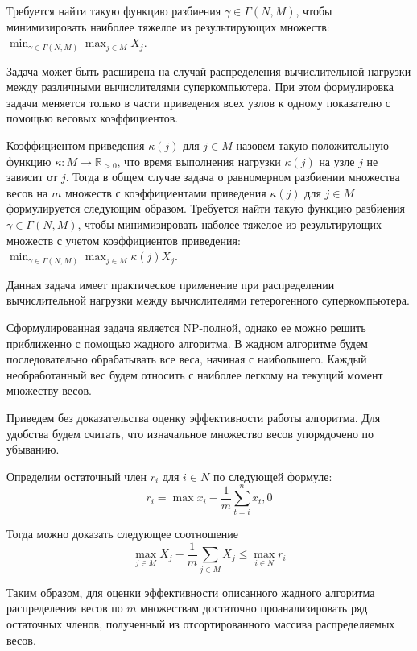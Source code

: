 Требуется найти такую функцию разбиения $\gamma \in \Gamma(N, M)$, чтобы минимизировать наиболее тяжелое из результирующих множеств: $\min_{\gamma \in \Gamma(N, M)}{\max_{j \in M}{X_j}}$.

Задача может быть расширена на случай распределения вычислительной нагрузки между различными вычислителями суперкомпьютера. При этом формулировка задачи меняется только в части приведения всех узлов к одному показателю с помощью весовых коэффициентов.

Коэффициентом приведения $\kappa(j)$ для $j \in M$ назовем такую положительную функцию $\kappa: M \rightarrow \mathbb{R}_{>0}$, что время выполнения нагрузки $\kappa(j)$ на узле $j$ не зависит от $j$.
Тогда в общем случае задача о равномерном разбиении множества весов на $m$ множеств с коэффициентами приведения $\kappa(j)$ для $j \in M$ формулируется следующим образом.
Требуется найти такую функцию разбиения $\gamma \in \Gamma(N, M)$, чтобы минимизировать наболее тяжелое из результирующих множеств с учетом коэффициентов приведения: $\min_{\gamma \in \Gamma(N, M)}{\max_{j \in M}{\kappa(j) X_j}}$.

Данная задача имеет практическое применение при распределении вычислительной нагрузки между вычислителями гетерогенного суперкомпьютера.

Сформулированная задача является NP-полной, однако ее можно решить приближенно с помощью жадного алгоритма.
В жадном алгоритме будем последовательно обрабатывать все веса, начиная с наибольшего.
Каждый необработанный вес будем относить с наиболее легкому на текущий момент множеству весов.

Приведем без доказательства оценку эффективности работы алгоритма.
Для удобства будем считать, что изначальное множество весов упорядочено по убыванию. 

Определим остаточный член $r_i$ для $i \in N$ по следующей формуле:
\begin{equation}
	r_i = \max{x_i - \frac{1}{m} \sum_{t = i}^{n}{x_t}, 0}
\end{equation}

Тогда можно доказать следующее соотношение
\begin{equation}
	\max_{j \in M}{X_j} - \frac{1}{m} \sum_{j \in M}{X_j} \le \max_{i \in N}{r_i}
\end{equation}

Таким образом, для оценки эффективности описанного жадного алгоритма распределения весов по $m$ множествам достаточно проанализировать ряд остаточных членов, полученный из отсортированного массива распределяемых весов.

